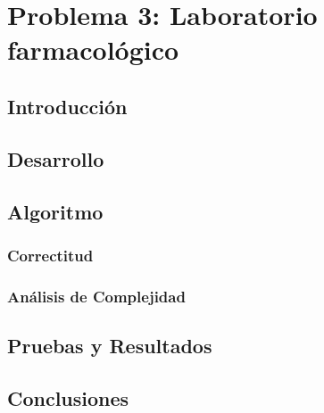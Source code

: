 \section{Problema 3: Laboratorio farmacol\'ogico}

\subsection{Introducci\'on}

\subsection{Desarrollo}



\subsection{Algoritmo} 



\subsubsection{Correctitud}



\subsubsection{Análisis de Complejidad}



\subsection{Pruebas y Resultados}


\subsection{Conclusiones}


